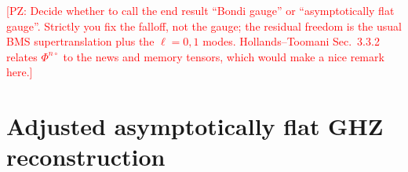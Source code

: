 \documentclass[preprint,aps,nofootinbib,a4paper,superscriptaddress,longbibliography,amsfonts, amssymb,amsmath,titlepage]{revtex4-1}
\numberwithin{equation}{section} %
\newcommand{\PZ}[1]{\textcolor{red}{\textsf{[PZ: #1]}}}
\newcommand{\PhiN}[1]{\Phi^{#1\circ}}
\begin{document}
\PZ{Decide whether to call the end result ``Bondi gauge'' or
``asymptotically flat gauge''.  Strictly you fix the falloff, not the gauge;
the residual freedom is the usual BMS supertranslation plus the
$\ell=0,1$ modes.  Hollands--Toomani Sec.~3.3.2 relates $\PhiN{n}$ to the
news and memory tensors, which would make a nice remark here.}


\section{Adjusted asymptotically flat GHZ reconstruction}
\label{sec:adjusted}
\end{document}
